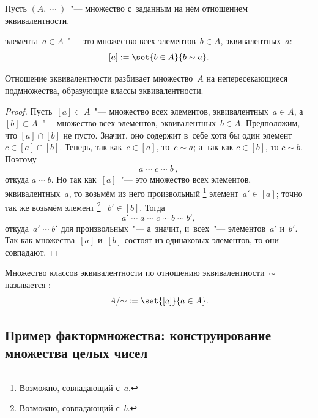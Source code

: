 	Пусть $(A, \sim)$~"--- множество с~заданным на нём отношением
	эквивалентности.
	\begin{definition}
		\label{def:equivalence_class}
		 элемента~$a \in A$~"--- это множество
		всех элементов~$b \in A$, эквивалентных~$a$:
		\[
			[a] :=
			\set{b \in A}{b \sim a}
			.
		\]
	\end{definition}

	\begin{lemma}
		 Отношение эквивалентности разбивает множество~$A$ на непересекающиеся
		 подмножества, образующие классы эквивалентности.
	\end{lemma}
	\begin{proof}
		Пусть~$[a] \subset A$~"--- множество всех элементов,
		эквивалентных~$a \in A$, а~$[b] \subset A$~"--- множество всех
		элементов,
		эквивалентных~$b \in A$. Предположим, что $[a] \cap [b]$ не пусто.
		Значит, оно содержит в~себе хотя бы один элемент~$c \in [a] \cap [b]$.
		Теперь, так как~$c \in [a]$, то~$c \sim a$; а~так как $c \in [b]$, то
		$c \sim b$. Поэтому
		\[
			a \sim c \sim b~,
		\]
		откуда $a \sim b$. Но так как~$[a]$~"--- это множество всех элементов,
		эквивалентных~$a$, то возьмём из него произвольный%
		\footnote{%
			Возможно, совпадающий с~$a$.%
		}
		элемент~$a' \in [a]$; точно так же возьмём элемент%
		\footnote{%
			Возможно, совпадающий с~$b$.%
		}
		~$b' \in [b]$. Тогда%
		\[
			a' \sim a \sim c \sim b \sim b'
			,
		\]
		откуда~$a' \sim b'$ для произвольных~"--- а~значит, и~всех~"---
		элементов~$a'$ и~$b'$. Так как множества~$[a]$ и~$[b]$
		состоят из одинаковых элементов, то они совпадают.%
	\end{proof}

	\begin{definition}
		\label{def:factorset}
		Множество классов эквивалентности по отношению эквивалентности~$\sim$
		называется \tdef{фактормножеством}:
		\[
			A/{\sim} := \set{[a]}{a \in A}.
		\]
	\end{definition}

	\subsection{Пример фактормножества: конструирование множества целых чисел}

		

